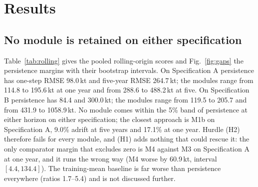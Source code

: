 \documentclass[preprint,11pt,authoryear]{elsarticle}
\theoremstyle{definition}
\theoremstyle{remark}
\begin{document}
\section{Results}\label{sec:results}

\FloatBarrier
\subsection{No module is retained on either specification}\label{sec:pooled}

Table~\ref{tab:rolling} gives the pooled rolling-origin scores and Fig.~\ref{fig:gaps} the persistence margins with their bootstrap intervals. On Specification A persistence has one-step RMSE 98.0\,kt and five-year RMSE 264.7\,kt; the modules range from 114.8 to 195.6\,kt at one year and from 288.6 to 488.2\,kt at five. On Specification B persistence has 84.4 and 300.0\,kt; the modules range from 119.5 to 205.7 and from 431.9 to 1058.9\,kt. No module comes within the 5\% band of persistence at either horizon on either specification; the closest approach is M1b on Specification A, 9.0\% adrift at five years and 17.1\% at one year. Hurdle (H2) therefore fails for every module, and (H1) adds nothing that could rescue it: the only comparator margin that excludes zero is M4 against M3 on Specification A at one year, and it runs the wrong way (M4 worse by 60.9\,kt, interval $[4.4, 134.4]$). The training-mean baseline is far worse than persistence everywhere (ratios 1.7--5.4) and is not discussed further.
\end{document}
